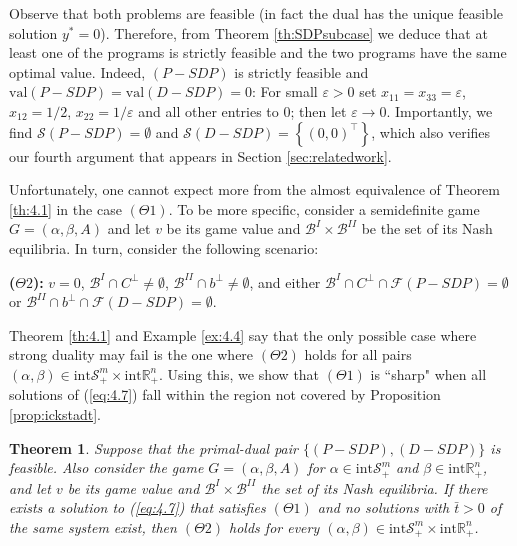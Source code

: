 \documentclass[11pt, twoside]{article}
\numberwithin{equation}{section}
\newtheorem{theorem}{Theorem}[section]
\theoremstyle{definition}
\begin{document}
Observe that both problems are feasible (in fact the dual has the unique feasible solution $y^*=0$). Therefore, from Theorem \ref{th:SDPsubcase} we deduce that at least one of the programs is strictly feasible and the two programs have the same optimal value. Indeed, \hyperlink{primalsdp}{$(P-SDP)$} is strictly feasible and $\text{val}(P-SDP)=\text{val}(D-SDP)=0$: For small $\varepsilon>0$ set $x_{11}=x_{33}=\varepsilon$, $x_{12}=1/2$, $x_{22}=1/\varepsilon$ and all other entries to $0$; then let $\varepsilon\to 0$. Importantly, we find $\mathcal{S}(P-SDP)=\emptyset$ and $\mathcal{S}(D-SDP)=\left\{(0,0)^\top\right\}$, which also verifies our fourth argument that appears in Section \ref{sec:relatedwork}.\par

Unfortunately, one cannot expect more from the almost equivalence of Theorem \ref{th:4.1} in the case \hyperlink{theta1}{$(\Theta1)$}. To be more specific, consider a semidefinite game $G=(\alpha,\beta,A)$ and let $v$ be its game value and $\mathcal{B}^I\times\mathcal{B}^{II}$ be the set of its Nash equilibria. In turn, consider the following scenario: \vspace{0.2cm}\par
\hypertarget{theta2}{}
\noindent\textbf{($\Theta 2$):} $v=0$, $\mathcal{B}^{I}\cap C^{\perp}\neq\emptyset$, $\mathcal{B}^{II}\cap b^{\perp}\neq\emptyset$, and either $\mathcal{B}^{I}\cap C^{\perp}\cap\mathcal{F}(P-SDP)=\emptyset$ or $\mathcal{B}^{II}\cap b^{\perp}\cap\mathcal{F}(D-SDP)=\emptyset$.\vspace{0.2cm}\par

Theorem \ref{th:4.1} and Example \ref{ex:4.4} say that the only possible case where strong duality may fail is the one where \hyperlink{theta2}{$(\Theta2)$} holds for all pairs $(\alpha,\beta)\in \text{int}\mathcal{S}^{m}_{+}\times\text{int} \mathbb{R}^{n}_{+}$. Using this, we show that \hyperlink{theta1}{$(\Theta1)$} is ``sharp" when all solutions of (\ref{eq:4.7}) fall within the region not covered by Proposition \ref{prop:ickstadt}.

\begin{theorem}\label{th:theta2}
     Suppose that the primal-dual pair \hyperlink{primaldualsdp}{$\{(P-SDP),(D-SDP)\}$} is feasible. Also consider the game $G=(\alpha,\beta,A)$ for $\alpha\in\text{int}\mathcal{S}^{m}_{+}$ and $\beta\in\text{int}\mathbb{R}^{n}_{+}$, and let $v$ be its game value and $\mathcal{B}^I\times\mathcal{B}^{II}$ the set of its Nash equilibria. If there exists a solution to (\ref{eq:4.7}) that satisfies \hyperlink{theta1}{$(\Theta1)$} and no solutions with $\bar{t}>0$ of the same system exist, then \hyperlink{theta2}{$(\Theta2)$} holds for every $(\alpha,\beta)\in \text{int}\mathcal{S}^{m}_{+}\times\text{int} \mathbb{R}^{n}_{+}$.
\end{theorem}
\end{document}
